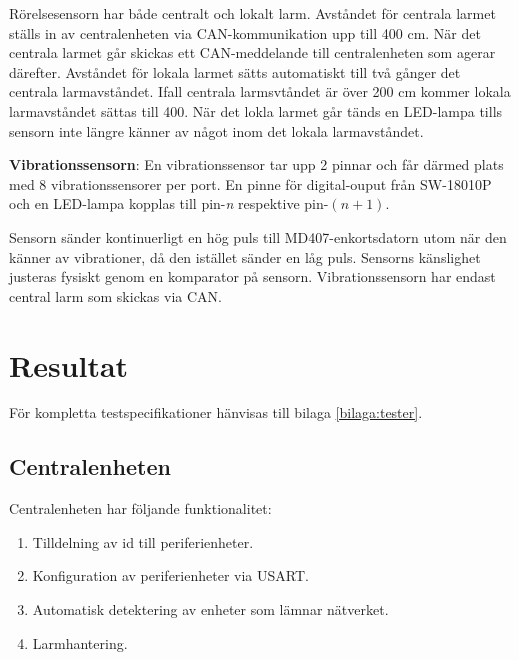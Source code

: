 \documentclass{article}
\begin{document}
Rörelsesensorn har både centralt och lokalt larm. Avståndet för centrala larmet ställs in av centralenheten via CAN-kommunikation
upp till 400 cm. När det centrala larmet går skickas ett CAN-meddelande till centralenheten som agerar därefter.
Avståndet för lokala larmet sätts automatiskt till två gånger det centrala larmavståndet. Ifall centrala larmsvtåndet är över 200 cm kommer
lokala larmavståndet sättas till 400. När det lokla larmet går tänds en LED-lampa tills sensorn inte längre känner av något inom
det lokala larmavståndet.

\textbf{Vibrationssensorn}:
En vibrationssensor tar upp 2 pinnar och får därmed plats med 8 vibrationssensorer per port.
En pinne för digital-ouput från SW-18010P och en LED-lampa kopplas till pin-\textit{n} respektive pin-$(n+1)$.

Sensorn sänder kontinuerligt en hög puls till MD407-enkortsdatorn utom när den
känner av vibrationer, då den istället sänder en låg puls. Sensorns känslighet justeras fysiskt genom en komparator på sensorn.
Vibrationssensorn har endast central larm som skickas via CAN.

\newpage
 \section{Resultat}
 För kompletta testspecifikationer hänvisas till bilaga \ref{bilaga:tester}.

 \subsection{Centralenheten}
 Centralenheten har följande funktionalitet:
 \begin{enumerate}
     \item Tilldelning av id till periferienheter.
     \item Konfiguration av periferienheter via USART.
     \item Automatisk detektering av enheter som lämnar nätverket.
     \item Larmhantering.
 \end{enumerate}
\end{document}
